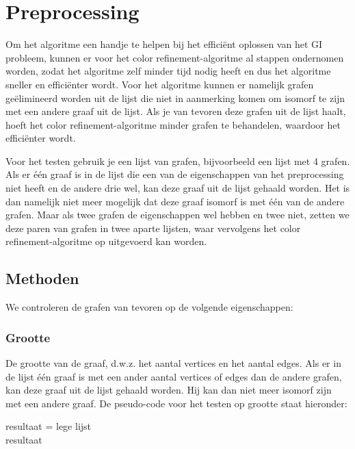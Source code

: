 \documentclass{article}
\begin{document}

\section{Preprocessing}
Om het algoritme een handje te helpen bij het effici\"ent oplossen van het GI probleem, kunnen er voor het color refinement-algoritme al stappen ondernomen worden, zodat het algoritme zelf minder tijd nodig heeft en dus het algoritme sneller en effici\"enter wordt.
Voor het algoritme kunnen er namelijk grafen ge\"elimineerd worden uit de lijst die niet in aanmerking komen om isomorf te zijn met een andere graaf uit de lijst. Als je van tevoren deze grafen uit de lijst haalt, hoeft het color refinement-algoritme minder grafen te behandelen, waardoor het effici\"enter wordt.

Voor het testen gebruik je een lijst van grafen, bijvoorbeeld een lijst met 4 grafen. Als er \'e\'en graaf is in de lijst die een van de eigenschappen van het preprocessing niet heeft en de andere drie wel, kan deze graaf uit de lijst gehaald worden. Het is dan namelijk niet meer mogelijk dat deze graaf isomorf is met \'e\'en van de andere grafen. Maar als twee grafen de eigenschappen wel hebben en twee niet, zetten we deze paren van grafen in twee aparte lijsten, waar vervolgens het color refinement-algoritme op uitgevoerd kan worden.

\subsection{Methoden}
We controleren de grafen van tevoren op de volgende eigenschappen:
\subsubsection{Grootte}
De grootte van de graaf, d.w.z. het aantal vertices en het aantal edges. Als er in de lijst één graaf is met een ander aantal vertices of edges dan de andere grafen, kan deze graaf uit de lijst gehaald worden. Hij kan dan niet meer isomorf zijn met een andere graaf. De pseudo-code voor het testen op grootte staat hieronder:\\

\begin{algorithm}[H]
	resultaat = lege lijst\\
	\Return resultaat
\end{algorithm}
\end{document}
